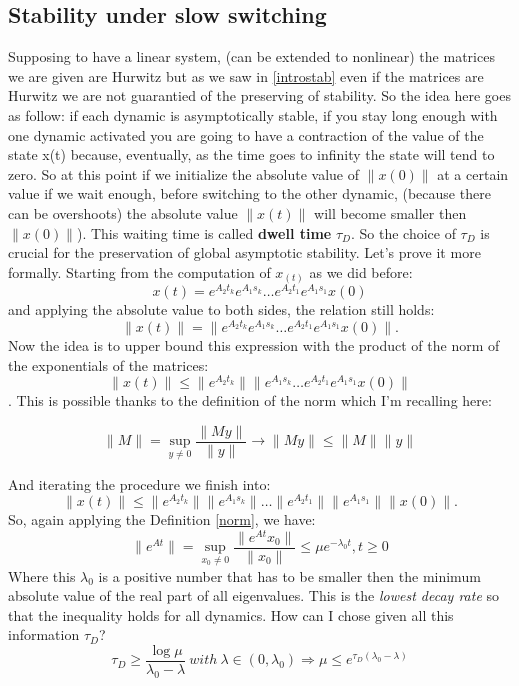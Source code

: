\subsection{Stability under slow switching}
Supposing to have a linear system, (can be extended to nonlinear) the matrices we are given are Hurwitz but as we saw in \ref{introstab} even if the matrices are Hurwitz we are not guarantied of the preserving of stability. So the idea here goes as follow: if each dynamic is asymptotically stable, if you stay long enough with one dynamic activated you are going to have a contraction of the value of the state x(t) because, eventually, as the time goes to infinity the state will tend to zero. So at this point if we initialize the absolute value of $\left\|x(0)\right\|$ at a certain value if we wait enough, before switching to the other dynamic, (because there can be overshoots) the absolute value $\left\|x(t)\right\|$ will become smaller then $\left\|x(0)\right\|$). This waiting time is called \textbf{dwell time} $\tau_D$. So the choice of $\tau_D$ is crucial for the preservation of global asymptotic stability. Let's prove it more formally.
Starting from the computation of $x_(t)$ as we did before:
\[x(t)=e^{A_2t_k}e^{A_1s_k}\dots e^{A_2t_1}e^{A_1s_1}x(0)\]
and applying the absolute value to both sides, the relation still holds:
\[\|x(t)\|=\|e^{A_2t_k}e^{A_1s_k}\dots e^{A_2t_1}e^{A_1s_1}x(0)\|.\]
Now the idea is to upper bound this expression with the product of the norm of the exponentials of the matrices:
\[\|x(t)\| \le \| e^{A_2t_k}\| \|e^{A_1s_k}\dots e^{A_2t_1}e^{A_1s_1}x(0)\|\].
This is possible thanks to the definition of the norm which I'm recalling here:
\begin{defn}[Norm] \label{norm}
	\[\|M\| = \sup_{y \neq0}\frac{\|My\|}{\|y\|}\to \|My\| \le \|M\|\|y\|
	\]
\end{defn}
And iterating the procedure we finish into:
\[\|x(t)\| \le \| e^{A_2t_k}\| \|e^{A_1s_k}\|\dots \|e^{A_2t_1}\|\|e^{A_1s_1}\|\|x(0)\|.\]
So, again applying the Definition \ref{norm}, we have:
\begin{equation}\label{eq1}
	\|e^{At}\|=\sup_{x_0 \neq0}\frac{\|e^{At}x_0\|}{\|x_0\|}\le \mu e^{-\lambda_0t},t \ge 0
\end{equation}
Where this $\lambda_0$ is a positive number that has to be smaller then the minimum absolute value of the real part of all eigenvalues. This is the \emph{lowest decay rate} so that the inequality holds for all dynamics.
How can I chose given all this information $\tau_D$? 
\begin{equation} \label{eq2}
	\tau_D \ge \frac{\log\mu}{\lambda_0-\lambda} \ with \ \lambda\in(0,\lambda_0)\Longrightarrow \mu \le e^{\tau_D(\lambda_0-\lambda)}
\end{equation}

